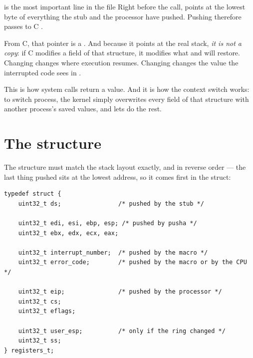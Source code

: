 \begin{concept}{ is the most important line in the file}
Right before the call,  points at the lowest byte of everything the stub and the processor
have pushed. Pushing  therefore passes to C .

From C, that pointer is a . And because it points at the real stack, \emph{it is
not a copy}: if C modifies a field of that structure, it modifies what  and 
will restore. Changing  changes where execution resumes. Changing 
changes the value the interrupted code sees in .

This is how system calls return a value. And it is how the context switch works: to switch process,
the kernel simply overwrites every field of that structure with another process's saved values, and
lets  do the rest.
\end{concept}

\section{The  structure}

The structure must match the stack layout exactly, and in reverse order --- the last thing pushed
sits at the lowest address, so it comes first in the struct:

\begin{lstlisting}[style=c]
typedef struct {
    uint32_t ds;                /* pushed by the stub */

    uint32_t edi, esi, ebp, esp; /* pushed by pusha */
    uint32_t ebx, edx, ecx, eax;

    uint32_t interrupt_number;  /* pushed by the macro */
    uint32_t error_code;        /* pushed by the macro or by the CPU */

    uint32_t eip;               /* pushed by the processor */
    uint32_t cs;
    uint32_t eflags;

    uint32_t user_esp;          /* only if the ring changed */
    uint32_t ss;
} registers_t;
\end{lstlisting}

